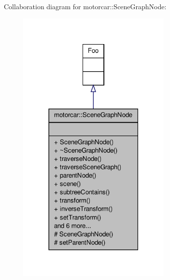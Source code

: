 Collaboration diagram for motorcar\-:\-:Scene\-Graph\-Node\-:
\nopagebreak
\begin{figure}[H]
\begin{center}
\leavevmode
\includegraphics[width=218pt]{classmotorcar_1_1SceneGraphNode__coll__graph}
\end{center}
\end{figure}
